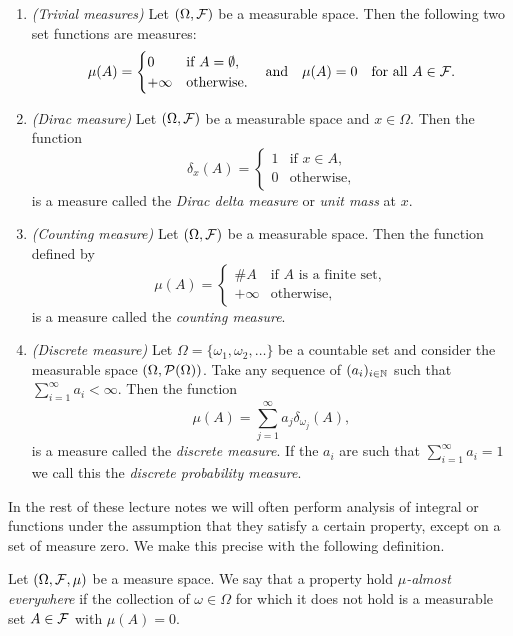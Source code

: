 \begin{example}
\hfil
\begin{enumerate}
\item \textit{(Trivial measures)} Let $(\Omega, \mathcal F)$ be a measurable space. Then the following two set functions are measures:
\[
	\mu(A) = \begin{cases}
		0 &\text{if } A = \emptyset, \\
		+\infty &\text{otherwise.}
	\end{cases}
	\quad \text{and} \quad
	\mu(A) = 0 \quad \text{for all } A \in \mathcal F.
\]
\item \textit{(Dirac measure)} Let $(\Omega, \mathcal F)$ be a measurable space and $x \in \Omega$. Then the function
\[
	\delta_x(A) = \begin{cases}
		1 &\text{if } x \in A, \\
		0 &\text{otherwise},
	\end{cases}
\]
is a measure called the \emph{Dirac delta measure} or \emph{unit mass} at $x$.
\item \textit{(Counting measure)} Let $(\Omega, \mathcal F)$ be a measurable space. Then the function defined by
\[
	\mu(A) = \begin{cases}
		\# A &\text{if $A$ is a finite set},\\
		+\infty &\text{otherwise}, 
	\end{cases}
\]
is a measure called the \emph{counting measure}.
\item \textit{(Discrete measure)} Let $\Omega = \{\omega_1, \omega_2, \dots\}$ be a countable set and consider the measurable space $(\Omega, \mathcal P(\Omega))$. Take any sequence of $(a_i)_{i \in \mathbb N}$ such that $\sum_{i = 1}^\infty a_i < \infty$. Then the function
\[
	\mu(A) = \sum_{j = 1}^\infty a_j \delta_{\omega_j}(A),
\]
is a measure called the \emph{discrete measure}. If the $a_i$ are such that $\sum_{i = 1}^\infty a_i = 1$ we call this the \emph{discrete probability measure}.
\end{enumerate}
\end{example}

In the rest of these lecture notes we will often perform analysis of integral or functions under the assumption that they satisfy a certain property, except on a set of measure zero. We make this precise with the following definition.

\begin{definition}\label{def:almost_everywhere}
Let $(\Omega, \mathcal F, \mu)$ be a measure space. We say that a property hold \emph{$\mu$-almost everywhere} if the collection of $\omega \in \Omega$ for which it does not hold is a measurable set $A \in \mathcal F$ with $\mu(A) = 0$. 
\end{definition}


